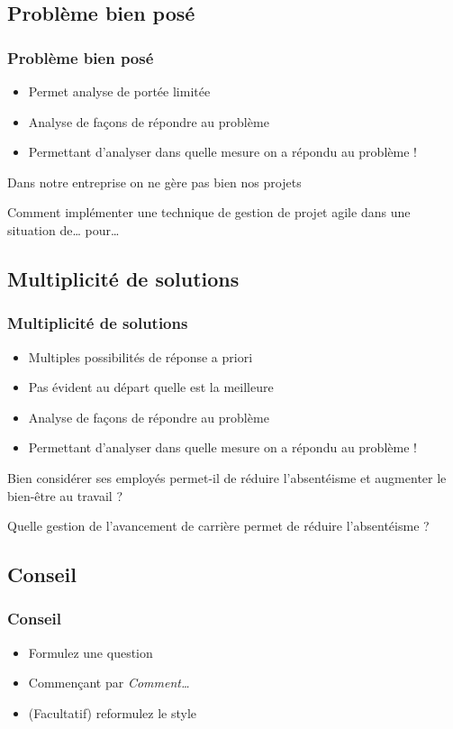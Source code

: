 \documentclass[french]{beamer}
\begin{document}
\subsection{Problème bien posé}
\begin{frame}
	\frametitle{Problème bien posé}
	\begin{itemize}
		\item Permet analyse de portée limitée
		\item Analyse de façons de répondre au problème
		\item Permettant d’analyser dans quelle mesure on a répondu au problème !
	\end{itemize}
	\begin{example}
		Dans notre entreprise on ne gère pas bien nos projets
	\end{example}
	\begin{example}
		Comment implémenter une technique de gestion de projet agile dans une situation de… pour…
	\end{example}
\end{frame}

\subsection{Multiplicité de solutions}
\begin{frame}
	\frametitle{Multiplicité de solutions}
	\begin{itemize}
		\item Multiples possibilités de réponse a priori
		\item Pas évident au départ quelle est la meilleure
		\item Analyse de façons de répondre au problème
		\item Permettant d’analyser dans quelle mesure on a répondu au problème !
	\end{itemize}
	\begin{example}
		Bien considérer ses employés permet-il de réduire l’absentéisme et augmenter le bien-être au travail ?
	\end{example}
	\begin{example}
		Quelle gestion de l’avancement de carrière permet de réduire l’absentéisme ?
	\end{example}
\end{frame}

\subsection{Conseil}
\begin{frame}
	\frametitle{Conseil}
	\begin{itemize}
		\item Formulez une question
		\item Commençant par \emph{Comment…}
		\item (Facultatif) reformulez le style
	\end{itemize}
\end{frame}
\end{document}
